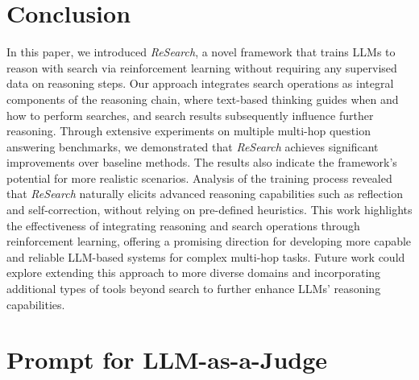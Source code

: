\documentclass{article}
\begin{document}
\section{Conclusion}
In this paper, we introduced \textit{ReSearch}, a novel framework that trains LLMs to reason with search via reinforcement learning without requiring any supervised data on reasoning steps. Our approach integrates search operations as integral components of the reasoning chain, where text-based thinking guides when and how to perform searches, and search results subsequently influence further reasoning. 
Through extensive experiments on multiple multi-hop question answering benchmarks, we demonstrated that \textit{ReSearch} achieves significant improvements over baseline methods. The results also indicate the framework's potential for more realistic scenarios. Analysis of the training process revealed that \textit{ReSearch} naturally elicits advanced reasoning capabilities such as reflection and self-correction, without relying on pre-defined heuristics. This work highlights the effectiveness of integrating reasoning and search operations through reinforcement learning, offering a promising direction for developing more capable and reliable LLM-based systems for complex multi-hop tasks. 
Future work could explore extending this approach to more diverse domains and incorporating additional types of tools beyond search to further enhance LLMs' reasoning capabilities.




\appendix

\section{Prompt for LLM-as-a-Judge}
\label{app:prompt-judge}
\end{document}
